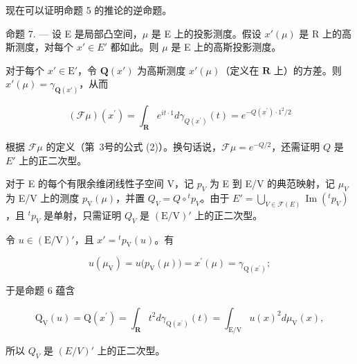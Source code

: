 现在可以证明命题 5 的推论的逆命题。

命题 7. --- 设 E 是局部凸空间，\(\mu\) 是 E 上的投影测度。假设 \(x'(\mu)\) 是 R 上的高斯测度，对每个 \(x' \in E'\) 都如此。则 \(\mu\) 是 E 上的高斯投影测度。

对于每个 \(x' \in \mathrm{E}'\)，令 \(\mathbf{Q}(x')\) 为高斯测度 \(x'(\mu)\)（定义在 \(\mathbf{R}\) 上）的方差。则 \(x'(\mu) = \gamma_{\mathbf{Q}(x')}\)，从而

\[
(\mathcal {F} \mu) (x ^ {\prime}) = \int_ {\mathbf {R}} e ^ {i t \cdot 1} d \gamma_ {Q (x ^ {\prime})} (t) = e ^ {- Q (x ^ {\prime}) \cdot 1 ^ {2} / 2}
\]

根据 \(\mathcal{F}\mu\) 的定义（第~3号的公式 (2)）。换句话说，\(\mathcal{F}\mu = e^{-Q/2}\)，还需证明 \(Q\) 是 \(E'\) 上的正二次型。

对于 E 的每个有限余维闭线性子空间 V，记 \(p_{V}\) 为 E 到 E/V 的典范映射，记 \(\mu_{V}\) 为 E/V 上的测度 \(p_{\mathrm{V}}(\mu)\)，并置 \(Q_{V} = Q \circ {}^{t} p_{V}\)。由于 \(E' = \bigcup_{V \in \mathcal{F}(E)} \operatorname{Im}({}^{t} p_{V})\)，且 \({}^{t} p_{V}\) 是单射，只需证明 \(Q_{V}\) 是 \((\mathrm{E}/\mathrm{V})'\) 上的正二次型。

令 \(u \in (\mathrm{E}/\mathrm{V})'\)，且 \(x' = {}^{t} p_{\mathrm{V}}(u)\)。有

\[
u (\mu_ {\mathrm{V}}) = u \big (p _ {\mathrm{V}} (\mu) \big) = x ^ {\prime} (\mu) = \gamma_ {\mathrm{Q} (x ^ {\prime})};
\]

于是命题 6 蕴含

\[
\mathrm{Q} _ {\mathrm{V}} (u) = \mathrm{Q} (x ^ {\prime}) = \int_ {\mathbf {R}} t ^ {2} d \gamma_ {\mathrm{Q} (x ^ {\prime})} (t) = \int_ {\mathrm{E} / \mathrm{V}} u (x) ^ {2} d \mu_ {\mathrm{V}} (x),
\]

所以 \(Q_V\) 是 \((E/V)'\) 上的正二次型。


